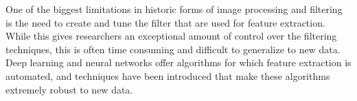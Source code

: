 One of the biggest limitations in historic forms of image processing and filtering is the need to create and tune the filter that are used for feature extraction. While this gives researchers an exceptional amount of control over the filtering techniques, this is often time consuming and difficult to generalize to new data. Deep learning and neural networks offer algorithms for which feature extraction is automated, and techniques have been introduced that make these algorithms extremely robust to new data.





